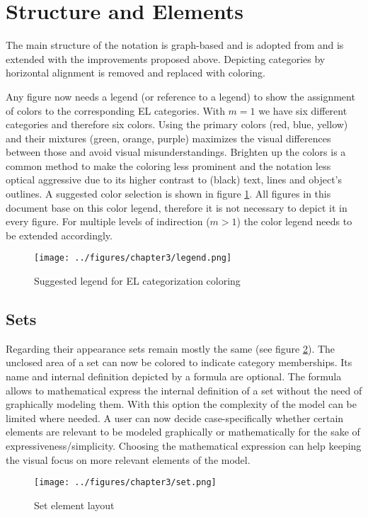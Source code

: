 \documentclass[twoside, openright, 12pt]{book}
\begin{document}
\section{Structure and Elements}
\label{gsl_elements}
The main structure of the notation is graph-based and is adopted from \cite{Amthor18} and is extended with the improvements proposed above.
Depicting categories by horizontal alignment is removed and replaced with coloring.

Any figure now needs a legend (or reference to a legend) to show the assignment of colors to the corresponding EL categories.
With $m=1$ we have six different categories and therefore six colors.
Using the primary colors (red, blue, yellow) and their mixtures (green, orange, purple) maximizes the visual differences between those and avoid visual misunderstandings.
Brighten up the colors is a common method to make the coloring less prominent and the notation less optical aggressive due to its higher contrast to (black) text, lines and object's outlines.
A suggested color selection is shown in figure \ref{fig:legend}.
All figures in this document base on this color legend, therefore it is not necessary to depict it in every figure.
For multiple levels of indirection ($m>1$) the color legend needs to be extended accordingly.

\begin{figure}[htb]
	\centering
	\texttt{[image: ../figures/chapter3/legend.png]}
	\caption{Suggested legend for EL categorization coloring}
	\label{fig:legend}
\end{figure}

\subsection{Sets}
Regarding their appearance sets remain mostly the same (see figure \ref{fig:set}).
The unclosed area of a set can now be colored to indicate category memberships.
Its name and internal definition depicted by a formula are optional.
The formula allows to mathematical express the internal definition of a set without the need of graphically modeling them.
With this option the complexity of the model can be limited where needed.
A user can now decide case-specifically whether certain elements are relevant to be modeled graphically or mathematically for the sake of expressiveness/simplicity.
Choosing the mathematical expression can help keeping the visual focus on more relevant elements of the model.

\begin{figure}[htb]
	\centering
	\texttt{[image: ../figures/chapter3/set.png]}
	\caption{Set element layout}
	\label{fig:set}
\end{figure}
\end{document}
